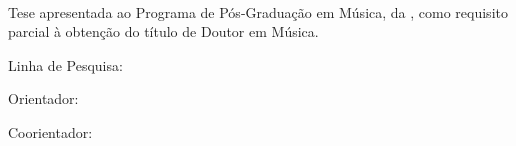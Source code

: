 \begin{center}
    \textbf{\instituicao}\\
    \textbf{\centro}\\
    \textbf{\programa}


    \vspace{4.5cm}
\autor\

    \begin{center}

    \vspace*{\fill} %
   \textbf{\titulo}
    \vspace*{\fill} %
    \end{center}

    \vfill
    \cidade\ \\
    \ano\
\end{center}
\thispagestyle{empty} %
\newpage


\begin{center}
\autor\
\end{center}
\vspace{4.5cm}	

\begin{center}	
\textbf{\titulo}
\end{center}



\begin{center}
    \vspace*{\fill} %
    \hspace*{\fill} %
    \parbox{10cm} %
    {\noindent
    Tese apresentada ao Programa de Pós-Graduação em Música, da \instituicao, como requisito parcial à obtenção do título de Doutor em Música.

    \par Linha de Pesquisa: \linhadepesquisa

    \vspace{0.5cm}
    \par Orientador: \orientador{}
    \par Coorientador: \coorientador{}
    }
    \vfill
    \vspace*{\fill} %
\end{center}


\begin{center}
\cidade\ \\
\ano\
\end{center}

\thispagestyle{empty} %